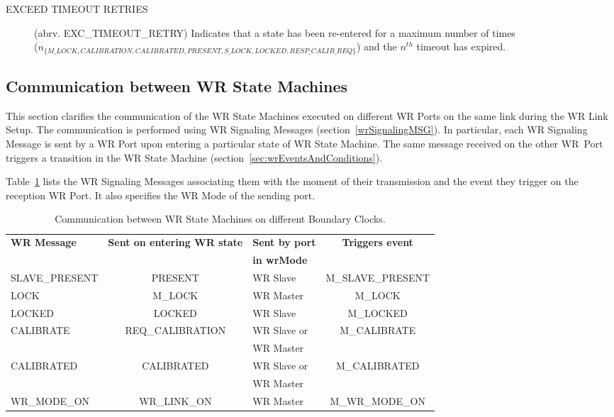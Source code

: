 \documentclass[a4paper, 12pt]{article}
\begin{document}
\begin{description}
\item[EXCEED TIMEOUT RETRIES] 		(abrv. EXC\_TIMEOUT\_RETRY)	Indicates that a state 
      has been re-entered for a maximum number of times \\
      ($n_{\{M\_LOCK, CALIBRATION, CALIBRATED, PRESENT, S\_LOCK, LOCKED, RESP\_CALIB\_REQ\}}$) and 
      the $n^{th}$ timeout has expired.
									  
\end{description}

\newpage

\subsection{Communication between WR State Machines}
\label{sec:communicationWRfsm}

This section clarifies the communication of the WR State Machines executed on different WR Ports 
on the same link during the WR Link Setup. The communication is performed using WR Signaling Messages
(section~\ref{wrSignalingMSG}). In particular, each WR Signaling Message is sent by a WR Port 
upon entering a particular state of WR State Machine. The same message received on the other WR~Port 
triggers a transition in the WR State Machine (section~\ref{sec:wrEventsAndConditions}).

Table~\ref{tab:wrMsgVsEvents} lists the WR Signaling Messages associating them with the moment 
of their transmission and the event they trigger on the reception WR Port. 
It also specifies the WR Mode of the sending port.


\begin{table}[ph!]
\caption{Communication between WR State Machines on different Boundary Clocks.}
\centering
\begin{tabular}{| l | c | p{2.5cm} | c |}          \hline

\textbf{WR Message} &\textbf{Sent on entering WR state} & \textbf{Sent by port} & 
\textbf{Triggers event}    \\ 
               &             	  & \textbf{in wrMode} 	  &  			           \\ \hline
SLAVE\_PRESENT & PRESENT     	  & WR Slave		  & M\_SLAVE\_PRESENT	           \\ \hline
LOCK           & M\_LOCK      	  & WR Master		  & M\_LOCK		           \\ \hline
LOCKED         & LOCKED	     	  & WR Slave		  & M\_LOCKED		           \\ \hline
CALIBRATE      & REQ\_CALIBRATION & WR Slave or 	  & M\_CALIBRATE	           \\ 
	       & 		  & WR Master 		  & 			           \\ \hline
CALIBRATED     & CALIBRATED	  & WR Slave or 	  & M\_CALIBRATED	           \\ 
	       & 		  & WR Master 		  & 			           \\ \hline
WR\_MODE\_ON   & WR\_LINK\_ON     & WR Master 		  & M\_WR\_MODE\_ON	           \\ \hline
\end{tabular}
\label{tab:wrMsgVsEvents}
\end{table}
\end{document}
